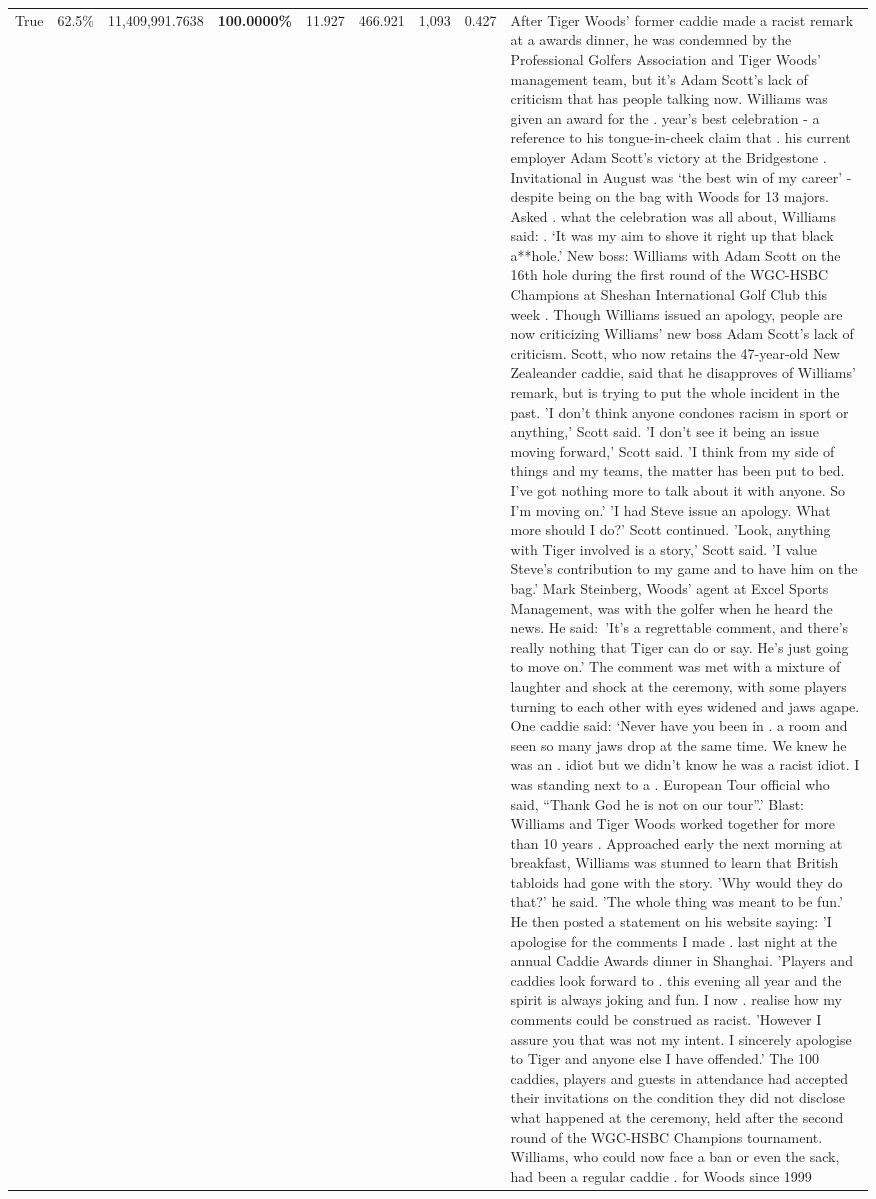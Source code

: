 \begin{table}[H]
\begin{tabular}{lllrlllll}
True & 62.5\% & 11,409,991.7638 & \bfseries \color{red} 100.0000\% & 11.927 & 466.921 & 1,093 & 0.427 & After Tiger Woods' former caddie made a racist remark at a awards dinner, he was condemned by the Professional Golfers Association and Tiger Woods' management team, but it's Adam Scott's lack of criticism that has people talking now. Williams was given an award for the . year’s best celebration - a reference to his tongue-in-cheek claim that . his current employer Adam Scott’s victory at the Bridgestone . Invitational in August was ‘the best win of my career’ - despite being on the bag with Woods for 13 majors. Asked . what the celebration was all about, Williams said: . ‘It was my aim to shove it right up that black a**hole.’ New boss: Williams with Adam Scott  on the 16th hole during the first round of the WGC-HSBC Champions at Sheshan International Golf Club this week . Though Williams issued an apology, people are now criticizing Williams' new boss Adam Scott's lack of criticism. Scott, who now retains the 47-year-old New Zealeander caddie, said that he disapproves of Williams' remark, but is trying to put the whole incident in the past. 'I don't think anyone condones racism in sport or anything,' Scott said. 'I don't see it being an issue moving forward,' Scott said. 'I think from my side of things and my teams, the matter has been put to bed. I've got nothing more to talk about it with anyone. So I'm moving on.' 'I had Steve issue an apology. What more should I do?' Scott continued. 'Look, anything with Tiger involved is a story,' Scott said. 'I value Steve's contribution to my game and to have him on the bag.' Mark Steinberg, Woods' agent at Excel Sports Management, was with the golfer when he heard the news. He said: 'It's a regrettable comment, and there's really nothing that Tiger can do or say. He's just going to move on.' The comment was met with a mixture of laughter and shock at the ceremony, with some players turning to each other with eyes widened and jaws agape. One caddie said: ‘Never have you been in . a room and seen so many jaws drop at the same time. We knew he was an . idiot but we didn’t know he was a racist idiot. I was standing next to a . European Tour official who said, “Thank God he is not on our tour”.’ Blast: Williams and Tiger Woods worked together for more than 10 years . Approached early the next morning at breakfast, Williams was stunned to learn that British tabloids had gone with the story. 'Why would they do that?' he said. 'The whole thing was meant to be fun.' He then posted a statement on his website saying: 'I apologise for the comments I made . last night at the annual Caddie Awards dinner in Shanghai. 'Players and caddies look forward to . this evening all year and the spirit is always joking and fun. I now . realise how my comments could be construed as racist. 'However I assure you that was not my intent. I sincerely apologise to Tiger and anyone else I have offended.' The 100 caddies, players and guests in attendance had accepted their invitations on the condition they did not disclose what happened at the ceremony, held after the second round of the WGC-HSBC Champions tournament. Williams, who could now face a ban or even the sack, had been a regular caddie . for Woods since 1999 
\end{tabular}
\end{table}
